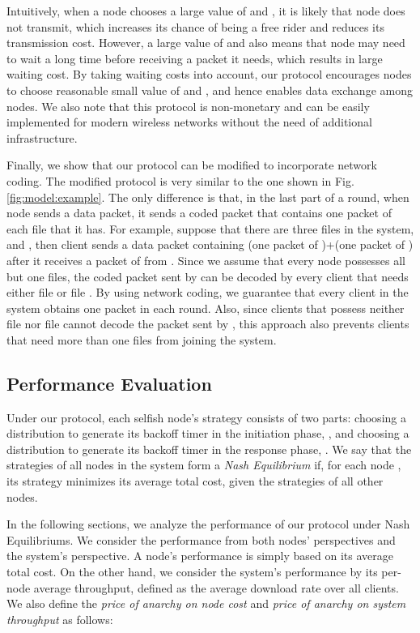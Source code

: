 \documentclass[11pt, conference]{IEEEtran}
\begin{document}
Intuitively, when a node  chooses a large value of  and , it is likely that node  does not transmit, which increases its chance of being a free rider and reduces its transmission cost. However, a large value of  and  also means that node  may need to wait a long time before receiving a packet it needs, which results in large waiting cost. By taking waiting costs into account, our protocol encourages nodes to choose reasonable small value of  and , and hence enables data exchange among nodes. We also note that this protocol is non-monetary and can be easily implemented for modern wireless networks without the need of additional infrastructure.

Finally, we show that our protocol can be modified to incorporate network coding. The modified protocol is very similar to the one shown in Fig. \ref{fig:model:example}. The only difference is that, in the last part of a round, when node  sends a data packet, it sends a coded packet that contains one packet of each file that it has. For example, suppose that there are three files  in the system, and , then client  sends a data packet containing (one packet of )+(one packet of ) after it receives a packet of  from . Since we assume that every node possesses all but one files, the coded packet sent by  can be decoded by every client that needs either file  or file . By using network coding, we guarantee that every client in the system obtains one packet in each round. Also, since clients that possess neither file  nor file  cannot decode the packet sent by , this approach also prevents clients that need more than one files from joining the system. 

\subsection{Performance Evaluation}

Under our protocol, each selfish node's strategy consists of two parts: choosing a distribution to generate its backoff timer in the initiation phase, , and choosing a distribution to generate its backoff timer in the response phase, . We say that the strategies of all nodes in the system form a \emph{Nash Equilibrium} if, for each node , its strategy minimizes its average total cost, given the strategies of all other nodes.

In the following sections, we analyze the performance of our protocol under Nash Equilibriums. We consider the performance from both nodes' perspectives and the system's perspective. A node's performance is simply based on its average total cost. On the other hand, we consider the system's performance by its per-node average throughput, defined as the average download rate over all clients. We also define the \emph{price of anarchy on node cost} and \emph{price of anarchy on system throughput} as follows:
\end{document}
